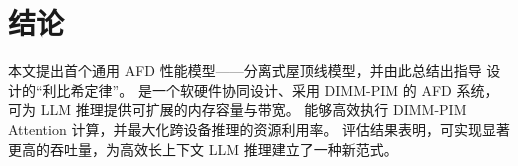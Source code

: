 \section{结论}
\label{s:conclusion}

本文提出首个通用 AFD 性能模型——分离式屋顶线模型，并由此总结出指导 \sys 设计的“利比希定律”。
\sys 是一个软硬件协同设计、采用 DIMM-PIM 的 AFD 系统，可为 LLM 推理提供可扩展的内存容量与带宽。
\sys 能够高效执行 DIMM-PIM Attention 计算，并最大化跨设备推理的资源利用率。
评估结果表明，\sys 可实现显著更高的吞吐量，为高效长上下文 LLM 推理建立了一种新范式。
